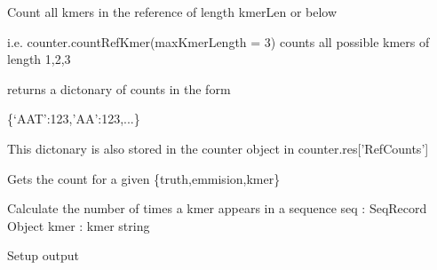 \documentclass[letterpaper,10pt,english]{sphinxmanual}
\begin{document}
\begin{fulllineitems}
\begin{fulllineitems}
\end{fulllineitems}


\begin{fulllineitems}
\label{index:proto_err.errorCount.counter.countRefKmer}
Count all kmers in the reference of length kmerLen or below

i.e.  counter.countRefKmer(maxKmerLength = 3) counts all possible kmers of length 1,2,3

returns a dictonary of counts in the form

\{`AAT':123,'AA':123,...\}

This dictonary is also stored in the counter object in counter.res{[}'RefCounts'{]}

\end{fulllineitems}


\begin{fulllineitems}
\label{index:proto_err.errorCount.counter.getCount}
Gets the count for a given \{truth,emmision,kmer\}

\end{fulllineitems}


\begin{fulllineitems}
\label{index:proto_err.errorCount.counter.kmerFreq}
Calculate the number of times a kmer appears in a sequence
seq : SeqRecord Object
kmer : kmer string

\end{fulllineitems}


\begin{fulllineitems}
\label{index:proto_err.errorCount.counter.readDiff}
\end{fulllineitems}


\begin{fulllineitems}
\label{index:proto_err.errorCount.counter.setup}
Setup output

\end{fulllineitems}


\end{fulllineitems}
\end{document}
